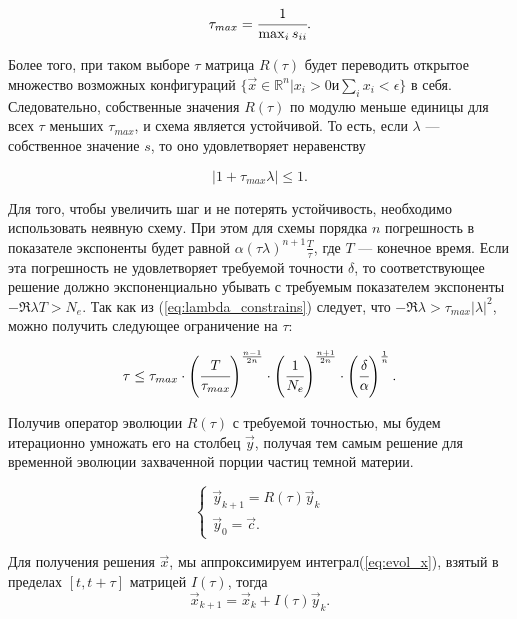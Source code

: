 \begin{equation}
	\label{eq:tau_max}
	\tau_{max} = \cfrac{1}{\max_i{s_{ii}}}.
\end{equation}

Более того, при таком выборе $\tau$ матрица $R(\tau)$ будет переводить открытое множество возможных конфигураций
$\{\vec{x} \in \mathbb{R}^n | x_i > 0 и \sum_i{x_i} < \epsilon \}$ в себя. Следовательно, собственные значения $R(\tau)$ по модулю меньше единицы для всех $\tau$ меньших $\tau_{max}$, и схема является устойчивой. То есть, если $\lambda$ --- собственное значение $s$, то оно удовлетворяет неравенству

\begin{equation}
	\label{eq:lambda_constrains}
	|1+\tau_{max}\lambda| \le 1.
\end{equation}

Для того, чтобы увеличить шаг и не потерять устойчивость, необходимо использовать неявную схему. При этом для схемы порядка $n$ погрешность в показателе экспоненты будет равной $\alpha (\tau \lambda)^{n+1} \frac{T}{\tau}$, где $T$ --- конечное время. Если эта погрешность не удовлетворяет требуемой точности $\delta$, то соответствующее решение должно экспоненциально убывать с требуемым показателем экспоненты $-\Re{\lambda} T > N_e$. Так как из (\ref{eq:lambda_constrains}) следует, что $-\Re{\lambda} > \tau_{max} |\lambda|^2$, можно получить следующее ограничение на $\tau$:

\begin{equation}
	\label{eq:tau_constrains}
	\tau \le \tau_{max}\cdot \left(\cfrac{T}{\tau_{max}}\right)^\frac{n-1}{2n}\cdot 
	\left(\cfrac{1}{N_e}\right)^{\frac{n+1}{2n}}\cdot  \left(\cfrac{\delta}{\alpha}\right)^{\frac{1}{n}}.
\end{equation}

Получив оператор эволюции $R(\tau)$ с требуемой точностью, мы будем итерационно умножать его на столбец $\vec{y}$, получая тем самым решение для временной эволюции захваченной порции частиц темной материи.

\begin{equation}
	\label{eq:solver_y}
	\begin{cases}
		\vec{y}_{k+1} = R(\tau) \vec{y}_k\\
		\vec{y}_0 = \vec{c}.
	\end{cases}
\end{equation}

Для получения решения $\vec{x}$, мы аппроксимируем интеграл(\ref{eq:evol_x}), взятый в пределах $[t,t+\tau]$ матрицей $I(\tau)$, тогда
\begin{equation}
	\label{eq:solver_x}
	\vec{x}_{k+1} = \vec{x}_{k} + I(\tau) \vec{y}_k.
\end{equation}

